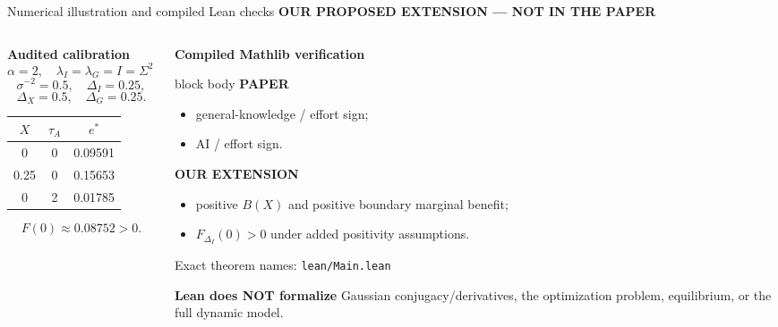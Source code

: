 \documentclass[aspectratio=169,10pt]{beamer}
\newcommand{\extlabel}{\textcolor{Alert}{\scriptsize\bfseries OUR PROPOSED EXTENSION --- NOT IN THE PAPER}}
\begin{document}
\begin{frame}{Numerical illustration and compiled Lean checks}
  \extlabel
  \vspace{.08cm}
  \begin{columns}[T,onlytextwidth]
    \begin{column}{.40\textwidth}
      \textbf{Audited calibration}
      \scriptsize
      \[
      \alpha=2,\quad \lambda_I=\lambda_G=I=\Sigma^2=1,
      \]
      \[
      \sigma^{-2}=0.5,\quad \Delta_I=0.25,
      \]
      \[
      \Delta_X=0.5,\quad \Delta_G=0.25.
      \]
      \renewcommand{\arraystretch}{1.18}
      \begin{tabular}{@{}ccc@{}}
        \toprule $X$ & $\tau_A$ & $e^*$ \\
        \midrule 0 & 0 & 0.09591 \\
        0.25 & 0 & 0.15653 \\
        0 & 2 & 0.01785 \\
        \bottomrule
      \end{tabular}
      \[
        \boxed{F(0)\approx0.08752>0.}
      \]
    \end{column}
    \begin{column}{.58\textwidth}
      \textbf{Compiled Mathlib verification}
      \begin{beamercolorbox}[rounded=true,sep=.5em]{block body}
      \footnotesize
      \textbf{PAPER}
      \begin{itemize}\footnotesize
        \item general-knowledge / effort sign;
        \item AI / effort sign.
      \end{itemize}
      \textbf{OUR EXTENSION}
      \begin{itemize}\footnotesize
        \item positive $B(X)$ and positive boundary marginal benefit;
        \item $F_{\Delta_I}(0)>0$ under added positivity assumptions.
      \end{itemize}
      \scriptsize Exact theorem names: \texttt{lean/Main.lean}
      \end{beamercolorbox}

      \vspace{.08cm}
      \scriptsize\textbf{Lean does NOT formalize} Gaussian conjugacy/derivatives,
      the optimization problem, equilibrium, or the full dynamic model.
    \end{column}
  \end{columns}
\end{frame}
\end{document}
